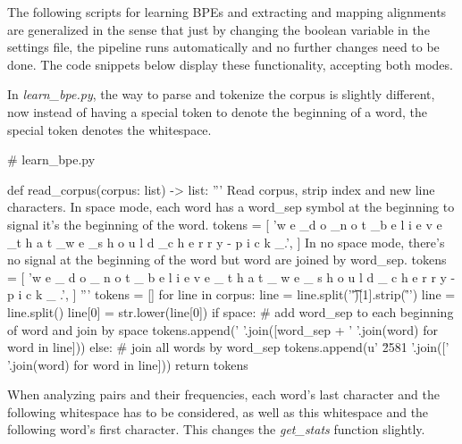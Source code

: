 The following scripts for learning BPEs and extracting and mapping alignments are generalized in the sense that just by changing the boolean variable in the settings file, the pipeline runs automatically and no further changes need to be done. The code snippets below display these functionality, accepting both modes.

In \emph{learn\_bpe.py}, the way to parse and tokenize the corpus is slightly different, now instead of having a special token to denote the beginning of a word, the special token denotes the whitespace.

\begin{python}
# learn_bpe.py

def read_corpus(corpus: list) -> list:
  '''
  Read corpus, strip index and new line characters.
  In space mode, each word has a word_sep symbol at the beginning to signal it's the beginning of the word.
  tokens = [
    'w e \_d o \_n o t \_b e l i e v e \_t h a t \_w e \_s h o u l d \_c h e r r y - p i c k \_.',
  ]
  In no space mode, there's no signal at the beginning of the word but word are joined by word_sep.
  tokens = [
    'w e \_ d o \_ n o t \_ b e l i e v e \_ t h a t \_ w e \_ s h o u l d \_ c h e r r y - p i c k \_ .',
  ]
  '''
  tokens = []
  for line in corpus:
    line = line.split('\t')[1].strip('\r\n ')
    line = line.split()
    line[0] = str.lower(line[0])
    if space:
      # add word_sep to each beginning of word and join by space
      tokens.append(' '.join([word_sep + ' '.join(word) for word in line]))
    else:
      # join all words by word_sep
      tokens.append(u' \u2581 '.join([' '.join(word) for word in line]))
  return tokens
\end{python}

When analyzing pairs and their frequencies, each word's last character and the following whitespace has to be considered, as well as this whitespace and the following word's first character. This changes the \emph{get\_stats} function slightly.

